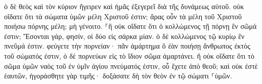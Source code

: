\documentclass{openreader}
\begin{document}
ὁ δὲ θεὸς καὶ τὸν κύριον ἤγειρεν καὶ ἡμᾶς ἐξεγερεῖ διὰ τῆς δυνάμεως αὐτοῦ. 
οὐκ οἴδατε ὅτι τὰ σώματα ὑμῶν μέλη Χριστοῦ ἐστιν; ἄρας οὖν τὰ μέλη τοῦ Χριστοῦ ποιήσω πόρνης μέλη; μὴ γένοιτο. 
⸀ἢ οὐκ οἴδατε ὅτι ὁ κολλώμενος τῇ πόρνῃ ἓν σῶμά ἐστιν; Ἔσονται γάρ, φησίν, οἱ δύο εἰς σάρκα μίαν. 
ὁ δὲ κολλώμενος τῷ κυρίῳ ἓν πνεῦμά ἐστιν. 
φεύγετε τὴν πορνείαν· πᾶν ἁμάρτημα ὃ ἐὰν ποιήσῃ ἄνθρωπος ἐκτὸς τοῦ σώματός ἐστιν, ὁ δὲ πορνεύων εἰς τὸ ἴδιον σῶμα ἁμαρτάνει. 
ἢ οὐκ οἴδατε ὅτι τὸ σῶμα ὑμῶν ναὸς τοῦ ἐν ὑμῖν ἁγίου πνεύματός ἐστιν, οὗ ἔχετε ἀπὸ θεοῦ; καὶ οὐκ ἐστὲ ἑαυτῶν, 
ἠγοράσθητε γὰρ τιμῆς· δοξάσατε δὴ τὸν θεὸν ἐν τῷ σώματι ⸀ὑμῶν. 
\end{document}
